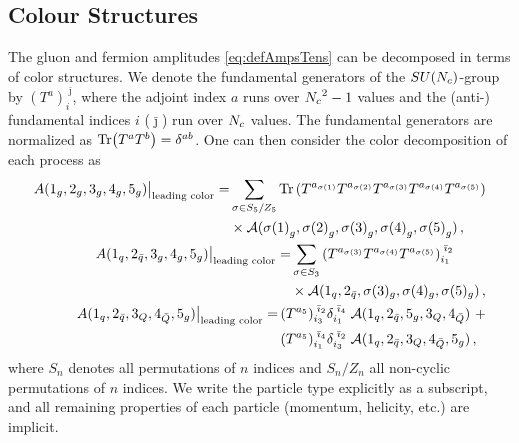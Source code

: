 \subsection{Colour Structures}
The gluon and fermion amplitudes \eqref{eq:defAmpsTens}
can be decomposed 
in terms of color structures. 
We denote the fundamental generators of the
$SU({N_c})$-group by $(T^a)^{\;\bar{\jmath}}_{i}$, where the
adjoint index $a$ runs over ${N_c}^2-1$ values and the 
(anti-) fundamental indices $i$  ($\bar \jmath$)
run over ${N_c}$ values. The fundamental generators are normalized
as $ \Tr(T^a T^b) = \delta^{ab}$. One can then consider the color decomposition of
each process as
%
\begin{align}
  \begin{split}
    \label{eq:ColorDecG}
    A(1_g, 2_g, 3_g, 4_g, 5_g) \big\vert_{\textrm{leading color}} = &
    \sum_{\sigma\in S_5/Z_5} \Tr\left(
    T^{a_{\sigma(1)}} T^{a_{\sigma(2)}} 
    T^{a_{\sigma(3)}} T^{a_{\sigma(4)}} T^{a_{\sigma(5)}} \right)\\
    &\times \mathcal{A}({\sigma(1)}_g, {\sigma(2)}_g, {\sigma(3)}_g, {\sigma(4)}_g, {\sigma(5)}_g)\,, 
  \end{split} \\
  \begin{split}
    \label{eq:ColorDec2Q}
    A(1_q, 2_{\bar{q}}, 3_g, 4_g, 5_g) \big\vert_{\textrm{leading color}} 
    = & \sum_{\sigma\in S_3} 
    \left( T^{a_{\sigma(3)}} T^{a_{\sigma(4)}} T^{a_{\sigma(5)}} \right)^{\;\bar{\imath}_2}_{i_1} \\
    & \times\mathcal{A}(1_q,2_{\bar{q}},\sigma(3)_g,\sigma(4)_g,\sigma(5)_g)\,,
  \end{split}\\
  \begin{split}
    \label{eq:ColorDec4Q}
    A(1_q, 2_{\bar{q}}, 3_Q, 4_{\bar{Q}}, 5_g)
    \big\vert_{\textrm{leading color}} 
    = & 
    \,(T^{a_5})^{\;\bar{\imath}_{2}}_{i_{3}} \delta^{\;\bar{\imath}_{4}}_{i_{1}}\;
    \mathcal{A}(1_{q}, 2_{\bar{q}}, 5_g, 3_{Q}, 4_{\bar{Q}}) \,\,+  \\
    & \,(T^{a_5})^{\;\bar{\imath}_{4}}_{i_{1}} \delta^{\;\bar{\imath}_{2}}_{i_{3}}\;
    \mathcal{A}(1_{q},2_{\bar{q}},3_{Q},4_{\bar{Q}},5_g) \,,
  \end{split}
\end{align}
where $S_n$ denotes all permutations of $n$ indices and 
$S_n/Z_n$ all non-cyclic permutations of $n$ indices. 
We write the particle type explicitly as a subscript, and all
remaining properties of each particle (momentum, helicity, 
etc.\@) are implicit. 

